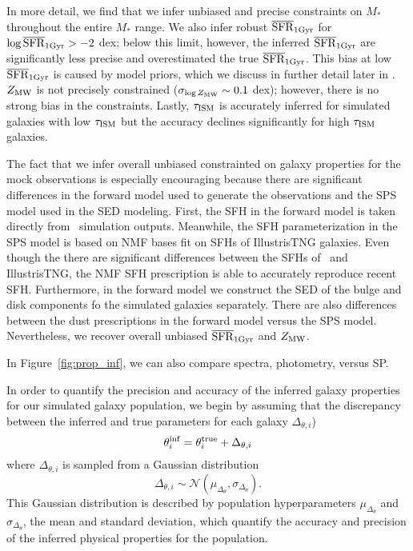 In more detail, we find that we infer unbiased and precise constraints on
$M_*$ throughout the entire $M_*$ range. 
We also infer robust $\overline{\rm SFR}_{\rm 1Gyr}$ for $\log \overline{\rm SFR}_{\rm 1Gyr} > -2$ dex; below this limit,
however, the inferred $\overline{\rm SFR}_{\rm 1Gyr}$ are significantly less precise and
overestimated the true $\overline{\rm SFR}_{\rm 1Gyr}$. 
This bias at low $\overline{\rm SFR}_{\rm 1Gyr}$ is caused by model priors, which we discuss in
further detail later in . 
$Z_{\rm MW}$ is not precisely constrained ($\sigma_{\log Z_{\rm MW}} \sim 0.1$
dex); however, there is no strong bias in the constraints. 
Lastly, $\tau_{\rm ISM}$ is accurately inferred for simulated galaxies with
low $\tau_{\rm ISM}$ but the accuracy declines significantly for high 
$\tau_{\rm ISM}$ galaxies. 

The fact that we infer overall unbiased constrainted on galaxy properties for
the mock observations is especially encouraging because there are significant
differences in the forward model used to generate the observations and the SPS
model used in the SED modeling. 
First, the SFH in the forward model is taken directly from \lgal~simulation
outputs. 
Meanwhile, the SFH parameterization in the SPS model is based on NMF bases fit
on SFHs of IllustrisTNG galaxies.
Even though the there are significant differences between the SFHs of \lgal~and
IllustrisTNG, the NMF SFH prescription is able to accurately reproduce recent
SFH.
Furthermore, in the forward model we construct the SED of the bulge and disk
components fo the simulated galaxies separately. 
There are also differences between the dust prescriptions in the forward model
versus the SPS model.
Nevertheless, we recover overall unbiased $\overline{\rm SFR}_{\rm 1Gyr}$ and $Z_{\rm MW}$. 

In Figure~\ref{fig:prop_inf}, we can also compare spectra, photometry, versus
SP.


In order to quantify the precision and accuracy of the inferred galaxy
properties for our simulated galaxy population, we begin by assuming that the
discrepancy between the inferred and true parameters for each galaxy 
$\Delta_{\theta,i}$) 
\begin{equation}
    \theta^{\rm inf}_i = \theta^{\rm true}_i + \Delta_{\theta,i}
\end{equation}
where $\Delta_{\theta,i}$ is sampled from a Gaussian distribution
\begin{equation}
    \Delta_{\theta,i} \sim \mathcal{N}(\mu_{\Delta_{\theta}}, \sigma_{\Delta_{\theta}}).
\end{equation}
This Gaussian distribution is described by population hyperparameters $\mu_{\Delta_{\theta}}$ and 
$\sigma_{\Delta_{\theta}}$, the mean and standard deviation, which quantify the accuracy and 
precision of the inferred physical properties for the population. 

